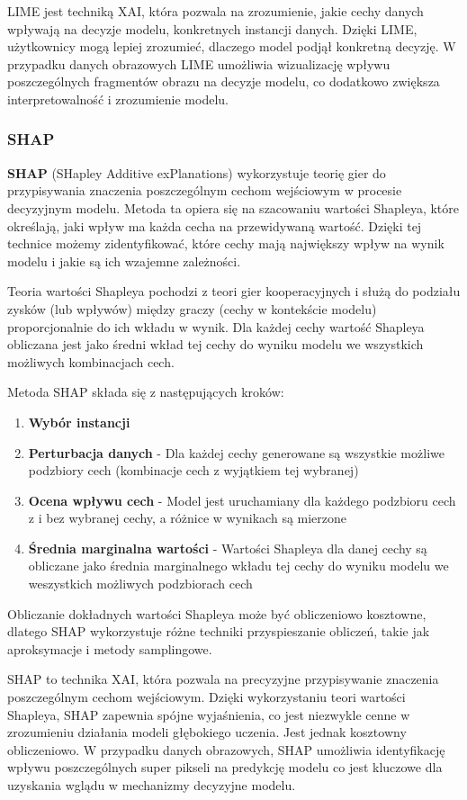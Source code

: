 LIME jest techniką XAI, która pozwala na zrozumienie, jakie cechy danych wpływają na decyzje modelu, konkretnych instancji danych.
Dzięki LIME, użytkownicy mogą lepiej zrozumieć, dlaczego model podjął konkretną decyzję.
W przypadku danych obrazowych LIME umożliwia wizualizację wpływu poszczególnych fragmentów obrazu na decyzje modelu, co dodatkowo zwiększa interpretowalność i zrozumienie modelu.

\subsubsection*{SHAP}
\textbf{SHAP} (SHapley Additive exPlanations) wykorzystuje teorię gier do przypisywania znaczenia poszczególnym cechom wejściowym w procesie decyzyjnym modelu.
Metoda ta opiera się na szacowaniu wartości Shapleya, które określają, jaki wpływ ma każda cecha na przewidywaną wartość.
Dzięki tej technice możemy zidentyfikować, które cechy mają największy wpływ na wynik modelu i jakie są ich wzajemne zależności.

Teoria wartości Shapleya pochodzi z teori gier kooperacyjnych i służą do podziału zysków (lub wpływów) między graczy (cechy w kontekście modelu) proporcjonalnie do ich wkładu w wynik.
Dla każdej cechy wartość Shapleya obliczana jest jako średni wkład tej cechy do wyniku modelu we wszystkich możliwych kombinacjach cech.

Metoda SHAP składa się z następujących kroków:
\begin{enumerate}
	\item \textbf{Wybór instancji}
	\item \textbf{Perturbacja danych} - Dla każdej cechy generowane są wszystkie możliwe podzbiory cech (kombinacje cech z wyjątkiem tej wybranej)
	\item \textbf{Ocena wpływu cech} - Model jest uruchamiany dla każdego podzbioru cech z i bez wybranej cechy, a różnice w wynikach są mierzone
	\item \textbf{Średnia marginalna wartości} - Wartości Shapleya dla danej cechy są obliczane jako średnia marginalnego wkładu tej cechy do wyniku modelu we weszystkich możliwych podzbiorach cech
\end{enumerate}

Obliczanie dokładnych wartości Shapleya może być obliczeniowo kosztowne, dlatego SHAP wykorzystuje różne techniki przyspieszanie obliczeń, takie jak aproksymacje i metody samplingowe.

SHAP to technika XAI, która pozwala na precyzyjne przypisywanie znaczenia poszczególnym cechom wejściowym.
Dzięki wykorzystaniu teori wartości Shapleya, SHAP zapewnia spójne wyjaśnienia, co jest niezwykle cenne w zrozumieniu działania modeli głębokiego uczenia.
Jest jednak kosztowny obliczeniowo.
W przypadku danych obrazowych, SHAP umożliwia identyfikację wpływu poszczególnych super pikseli na predykcję modelu co jest kluczowe dla uzyskania wglądu w mechanizmy decyzyjne modelu.

